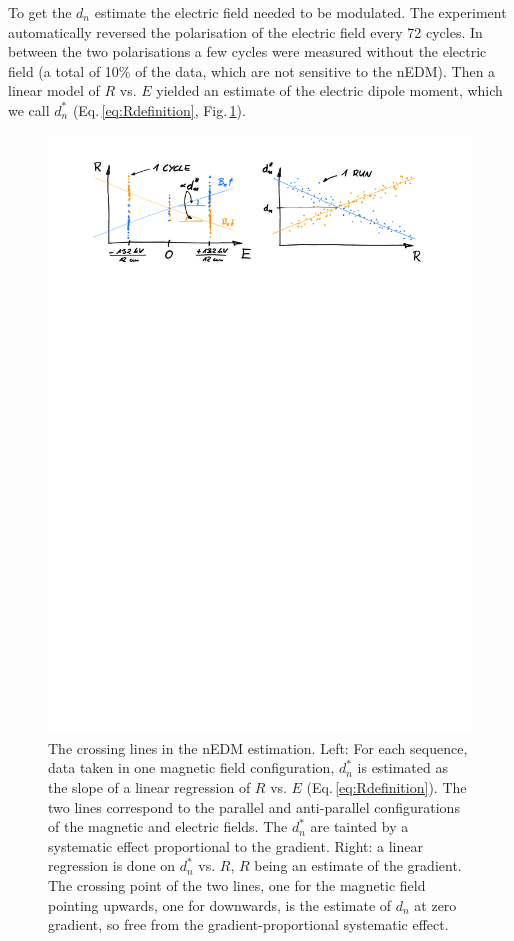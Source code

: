 To get the $d_n$ estimate the electric field needed to be modulated. The experiment automatically reversed the polarisation of the electric field every 72 cycles. In between the two polarisations a few cycles were measured without the electric field (a total of 10\% of the data, which are not sensitive to the nEDM). Then a linear model of  $R$ vs. $E$ yielded an estimate of the electric dipole moment, which we call $d_n^*$ (Eq.\,\ref{eq:Rdefinition}, Fig.\,\ref{fig:crossing_lines}).

\begin{figure}
  \centering
  \includegraphics[width=0.9\linewidth]{gfx/nEDMatPSI/crossing_lines.pdf}
  \caption{The crossing lines in the nEDM estimation. Left: For each sequence, data taken in one magnetic field configuration, $d_n^*$ is estimated as the slope of a linear regression of $R$ vs. $E$ (Eq.\,\ref{eq:Rdefinition}). The two lines correspond to the parallel and anti-parallel configurations of the magnetic and electric fields. The $d_n^*$ are tainted by a systematic effect proportional to the gradient. Right: a linear regression is done on $d_n^*$ vs. $R$, $R$ being an estimate of the gradient. The crossing point of the two lines, one for the magnetic field pointing upwards, one for downwards, is the estimate of $d_n$ at zero gradient, so free from the gradient-proportional systematic effect.}
  \label{fig:crossing_lines}
\end{figure}

